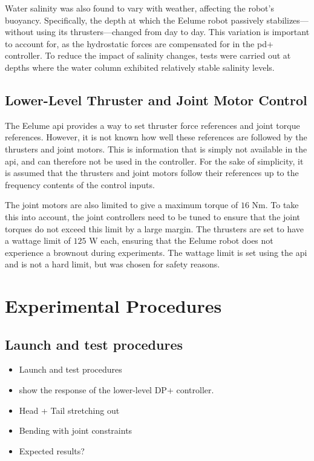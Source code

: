 Water salinity was also found to vary with weather, affecting the robot's 
buoyancy. Specifically, the depth at which the Eelume robot passively 
stabilizes—without using its thrusters—changed from day to day. This variation 
is important to account for, as the hydrostatic forces are compensated for in 
the \gls{pd+} controller. To reduce the impact of salinity changes, tests were 
carried out at depths where the water column exhibited relatively stable 
salinity levels.

\subsection*{Lower-Level Thruster and Joint Motor Control}
The Eelume \gls{api} provides a way to set thruster force references and joint
torque references. However, it is not known how well these references are
followed by the thrusters and joint motors. This is information that is simply
not available in the \gls{api}, and can therefore not be used in the controller.
For the sake of simplicity, it is assumed that the thrusters and joint motors
follow their references up to the frequency contents of the control inputs.

The joint motors are also limited to give a maximum torque of \(16\) Nm. To take
this into account, the joint controllers need to be tuned to ensure that the
joint torques do not exceed this limit by a large margin. The thrusters are set
to have a wattage limit of \(125\) W each, ensuring that the Eelume robot does
not experience a brownout during experiments. The wattage limit is set using the
\gls{api} and is not a hard limit, but was chosen for safety reasons.

\section{Experimental Procedures}
\subsection*{Launch and test procedures}
\begin{itemize}
    \item Launch and test procedures
    \item show the response of the lower-level DP+ controller.
    \item Head + Tail stretching out
    \item Bending with joint constraints
    \item Expected results?
\end{itemize}

